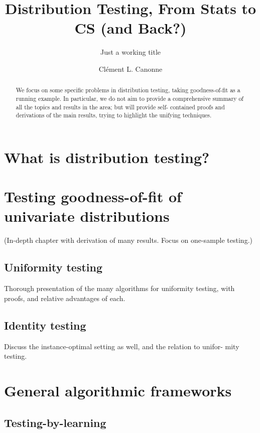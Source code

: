 \documentclass[biber]{nowfnt} %
\title{Distribution Testing, From Stats to CS (and Back?)}
\subtitle{Just a working title}
\author[1]{Cl\'ement L. Canonne}
\affil[1]{University of Sydney; clement.canonne@sydney.edu.au}
\begin{document}
\makeabstracttitle

\begin{abstract}
We focus on some specific problems in distribution testing,
taking goodness-of-fit as a running example. In particular,
we do not aim to provide a comprehensive summary of all
the topics and results in the area; but will provide self-
contained proofs and derivations of the main results, trying
to highlight the unifying techniques.
\end{abstract}

\chapter{What is distribution testing?}



\chapter{Testing goodness-of-fit of univariate distributions}
  \label{chap:identity}

(In-depth chapter with derivation of many results. Focus on one-sample
testing.)

\section{Uniformity testing}
Thorough presentation of the many algorithms for uniformity testing,
with proofs, and relative advantages of each.

\section{Identity testing}
Discuss the instance-optimal setting as well, and the relation to unifor-
mity testing.


\chapter{General algorithmic frameworks}
\section{Testing-by-learning}
\end{document}
